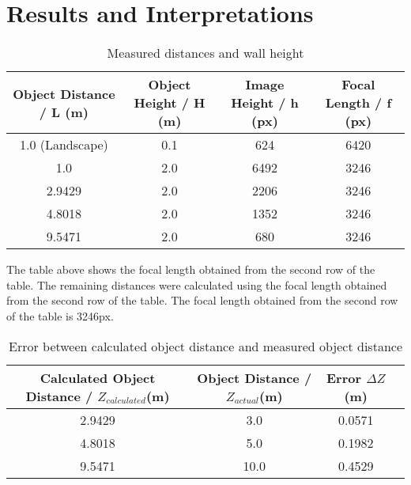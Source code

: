 \documentclass{article}
\begin{document}
\section{Results and Interpretations}
\begin{table}[h]
\centering
  \begin{tabular}{|c|c|c|c|}
  \hline


  Object Distance / L (m) & Object Height / H (m) & Image Height / h (px) & Focal Length / f (px)\\ \hline
  1.0 (Landscape)     & 0.1             & 624            & 6420           \\ \hline
  1.0                 & 2.0             & 6492           & 3246           \\ \hline
  2.9429              & 2.0             & 2206           & 3246           \\ \hline
  4.8018              & 2.0             & 1352           & 3246           \\ \hline
  9.5471              & 2.0             & 680            & 3246           \\ \hline
  \end{tabular}
\caption{Measured distances and wall height}
\label{tab:distances}
\end{table}

The table above shows the focal length obtained from the second row of the table. The remaining distances were calculated using the focal length obtained from the second row of the table. The focal length obtained from the second row of the table is 3246px.

\newpage
\begin{table}[h]
\centering
  \begin{tabular}{|c|c|c|c|}
  \hline

  Calculated Object Distance / $Z_{calculated}$(m) & Object Distance / $Z_{actual}$(m) & Error $\Delta Z$(m) \\ \hline
  2.9429              & 3.0             & 0.0571            \\ \hline
  4.8018              & 5.0             & 0.1982            \\ \hline
  9.5471              & 10.0            & 0.4529            \\ \hline
  \end{tabular}
\caption{Error between calculated object distance and measured object distance}
\label{tab:error}
\end{table}
\end{document}
